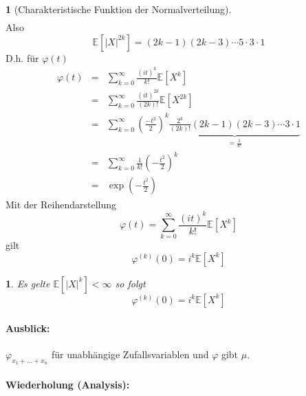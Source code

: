 \documentclass[10pt,a4paper]{report}
\numberwithin{equation}{section}
\numberwithin{figure}{section}
\theoremstyle{plain}
\theoremstyle{definition}
\newtheorem{example}[thm]{\protect\examplename}
\theoremstyle{remark}
\theoremstyle{plain}
\newtheorem{lem}[thm]{\protect\lemmaname}
\providecommand{\examplename}{Beispiel}
\providecommand{\lemmaname}{Lemma}
\newcommand{\1}{ \mathbb{1} } %
\begin{document}
\begin{example}[Charakteristische Funktion der Normalverteilung]
\begin{eqnarray*}
  \end{eqnarray*}
  Also 
  \[
  \mathbb{E}\left[\left|X\right|^{2k}\right]=\left(2k-1\right)\left(2k-3\right)\cdots5\cdot3\cdot1
  \]
  D.h. für $\varphi\left(t\right)$
  \begin{eqnarray*}
    \varphi\left(t\right) & = & \sum_{k=0}^{\infty}\frac{\left(it\right)^{k}}{k!}\mathbb{E}\left[X^{k}\right]\\
    & = & \sum_{k=0}^{\infty}\frac{\left(it\right)^{2k}}{\left(2k\right)!}\mathbb{E}\left[X^{2k}\right]\\
    & = & \sum_{k=0}^{\infty}\left(\frac{-t^{2}}{2}\right)^{k}\underset{=\frac{1}{k!}}{\underbrace{\frac{2^{k}}{(2k)!}\left(2k-1\right)\left(2k-3\right)\cdots3\cdot1}}\\
    & = & \sum_{k=0}^{\infty}\frac{1}{k!}\left(-\frac{t^{2}}{2}\right)^{k}\\
    & = & \exp\left(-\frac{t^{2}}{2}\right)
  \end{eqnarray*}
  Mit der Reihendarstellung 
  \[
  \varphi\left(t\right)=\sum_{k=0}^{\infty}\frac{\left(it\right)^{k}}{k!}\mathbb{E}\left[X^{k}\right]
  \]
  gilt
  \[
  \varphi^{(k)}\left(0\right)=i^{k}\mathbb{E}\left[X^{k}\right]
  \]
\end{example}
\begin{lem} %
  Es gelte $\mathbb{E}\left[\left|X\right|^{k}\right]<\infty$ so folgt
  \[
  \varphi^{\left(k\right)}\left(0\right)=i^{k}\mathbb{E}\left[X^{k}\right]
  \]

\end{lem}

\paragraph*{Ausblick:}

$\varphi_{x_{1}+\ldots+x_{n}}$ für unabhängige Zufallsvariablen und $\varphi$
gibt $\mu$.



\paragraph*{Wiederholung (Analysis): }
\end{document}

